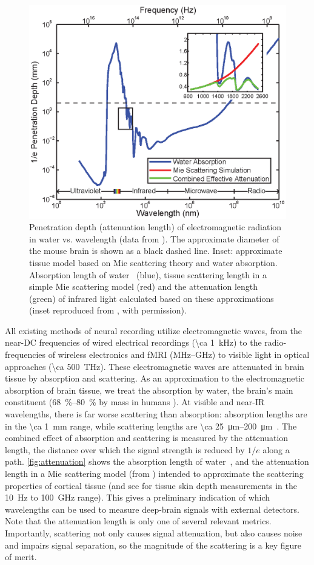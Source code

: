 \begin{figure}[htbp]
\caption{%
Penetration depth (attenuation length) of electromagnetic radiation in water vs. wavelength (data from \cite{jonasz07}).
The approximate diameter of the mouse brain is shown as a black dashed line.
Inset: approximate tissue model based on Mie scattering theory and water absorption. Absorption length of water~\cite{kou93} (blue), tissue scattering length in a simple Mie scattering model (red) and the attenuation length (green) of infrared light calculated based on these approximations (inset reproduced from \cite{kou93}, with permission).}
\label{fig:attenuation}
\centering
\includegraphics[width=0.5\linewidth]{figs/Fig2.eps}
\end{figure}

All existing methods of neural recording utilize electromagnetic waves, from the near-DC frequencies of wired electrical recordings (\SI{\ca 1}{\kilo\hertz}) to the radio-frequencies of wireless electronics and fMRI (MHz--GHz) to visible light in optical approaches (\SI{\ca 500}{\tera\hertz}).
These electromagnetic waves are attenuated in brain tissue by absorption and scattering.
As an approximation to the electromagnetic absorption of brain tissue, we treat the absorption by water, the brain's main constituent (\SIrange{68}{80}{\percent} by mass in humans \cite{dobbing73,fatouros99}).
At visible and near-IR wavelengths, there is far worse scattering than absorption: absorption lengths are in the \SI{\ca 1}{\milli\meter} range, while scattering lengths are \SIrange{\ca 25}{200}{\micro\meter}~\cite{Wilt2009}. The combined effect of absorption and scattering is measured by the attenuation length, the distance over which the signal strength is reduced by $1/e$ along a path.
\autoref{fig:attenuation} shows the absorption length of water~\cite{kou93}, and the attenuation length in a Mie scattering model (from \cite{horton13}) intended to approximate the scattering properties of cortical tissue (and see \cite{gabriel1996} for tissue skin depth measurements in the \SI{10}{\hertz} to \SI{100}{\giga\hertz} range).
This gives a preliminary indication of which wavelengths can be used to measure deep-brain signals with external detectors. Note that the attenuation length is only one of several relevant metrics. Importantly, scattering not only causes signal attenuation, but also causes noise and impairs signal separation, so the magnitude of the scattering is a key figure of merit.

